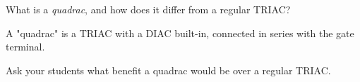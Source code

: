 

What is a {\it quadrac}, and how does it differ from a regular TRIAC?







A "quadrac" is a TRIAC with a DIAC built-in, connected in series with the gate terminal.







Ask your students what benefit a quadrac would be over a regular TRIAC.  





